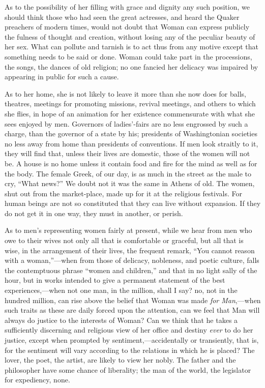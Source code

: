 As to the possibility of her filling with grace and dignity any such
position, we should think those who had seen the great actresses, and
heard the Quaker preachers of modern times, would not doubt that Woman
can express publicly the fulness of thought and creation, without
losing any of the peculiar beauty of her sex. What can pollute and
tarnish is to act thus from any motive except that something needs to
be said or done. Woman could take part in the processions, the songs,
the dances of old religion; no one fancied her delicacy was impaired
by appearing in public for such a cause.

As to her home, she is not likely to leave it more than she now does
for balls, theatres, meetings for promoting missions, revival
meetings, and others to which she flies, in hope of an animation for
her existence commensurate with what she sees enjoyed by men.
Governors of ladies'-fairs are no less engrossed by such a charge,
than  the governor of a state by his; presidents of
Washingtonian societies no less away from home than presidents of
conventions. If men look straitly to it, they will find that, unless
their lives are domestic, those of the women will not be. A house is
no home unless it contain food and fire for the mind as well as for
the body. The female Greek, of our day, is as much in the street as
the male to cry, ``What news?'' We doubt not it was the same in
Athens of old. The women, shut out from the market-place, made up for
it at the religious festivals. For human beings are not so constituted
that they can live without expansion. If they do not get it in one
way, they must in another, or perish.

As to men's representing women fairly at present, while we hear from
men who owe to their wives not only all that is comfortable or
graceful, but all that is wise, in the arrangement of their lives, the
frequent remark, ``You cannot reason with a woman,''---when from those
of delicacy, nobleness, and poetic culture, falls the contemptuous
phrase ``women and children,'' and that in no light sally of the hour,
but in works intended to give a permanent statement of the best
experiences,---when not one man, in the million, shall I say? no, not
in the hundred million, can rise above the belief that Woman was made
\textit{for Man},---when such traits as these are daily forced upon
the attention, can we feel that Man will always do justice to the
interests of Woman? Can we think that he takes a sufficiently
discerning and religious view of her office and destiny \textit{ever}
to do her justice, except when prompted by sentiment,---accidentally
or  transiently, that is, for the sentiment will vary
according to the relations in which he is placed? The lover, the poet,
the artist, are likely to view her nobly. The father and the
philosopher have some chance of liberality; the man of the world, the
legislator for expediency, none.

